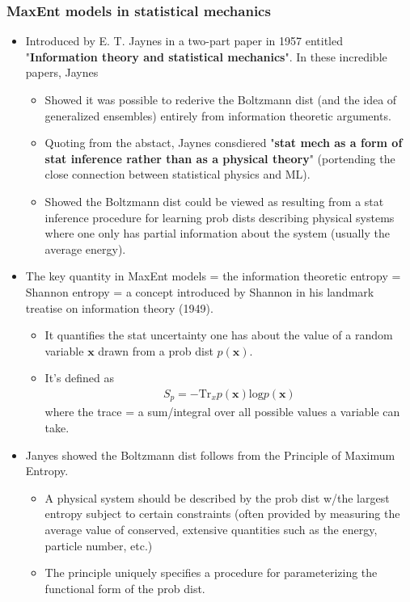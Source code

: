 \documentclass[norsk,a4paper,11pt]{article}
\begin{document}
\subsubsection{MaxEnt models in statistical mechanics}
\begin{itemize}
	\item Introduced by E. T. Jaynes in a two-part paper in 1957 entitled "\textbf{Information theory and statistical mechanics}". In these incredible papers, Jaynes
	\begin{itemize}
		\item Showed it was possible to rederive the Boltzmann dist (and the idea of generalized ensembles) entirely from information theoretic arguments.
		\item Quoting from the abstact, Jaynes consdiered "\textbf{stat mech as a form of stat inference rather than as a physical theory}" (portending the close connection between statistical physics and ML).
		\item Showed the Boltzmann dist could be viewed as resulting from a stat inference procedure for learning prob dists describing physical systems where one only has partial information about the system (usually the average energy).
	\end{itemize}
	\item The key quantity in MaxEnt models = the information theoretic entropy = Shannon entropy = a concept introduced by Shannon in his landmark treatise on information theory (1949).
	\begin{itemize}
		\item It quantifies the stat uncertainty one has about the value of a random variable $\bm{x}$ drawn from a prob dist $p(\bm{x})$.
		\item It's defined as
		\begin{align}
			S_p = -\text{Tr}_x p(\bm{x}) \text{log} p(\bm{x})
		\end{align}
		where the trace = a sum/integral over all possible values a variable can take.
	\end{itemize}
	\item Janyes showed the Boltzmann dist follows from the Principle of Maximum Entropy. 
	\begin{itemize}
		\item A physical system should be described by the prob dist w/the largest entropy subject to certain constraints (often provided by measuring the average value of conserved, extensive quantities such as the energy, particle number, etc.)
		\item The principle uniquely specifies a procedure for parameterizing the functional form of the prob dist. 

\end{itemize}
\end{itemize}
\end{document}

